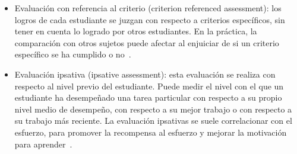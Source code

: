 \begin{itemize}
\item Evaluación con referencia al criterio (criterion referenced assessment): los logros de cada estudiante se juzgan con respecto a criterios específicos, sin tener en cuenta lo logrado por otros estudiantes. En la práctica, la comparación con otros sujetos puede afectar al enjuiciar de si un criterio específico se ha cumplido o no~\cite{dunn2002seeking}.
\item Evaluación ipsativa (ipsative assessment): esta evaluación se realiza con respecto al nivel previo del estudiante. Puede medir el nivel con el que un estudiante ha desempeñado una tarea particular con respecto a su propio nivel medio de desempeño, con respecto a su mejor trabajo o con respecto a su trabajo más reciente. La evaluación ipsativas se suele correlacionar con el esfuerzo, para promover la recompensa al esfuerzo y mejorar la motivación para aprender~\cite{hughes2011towards}.
\end{itemize}


